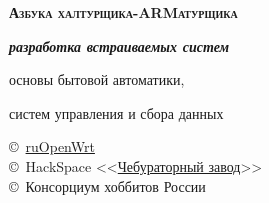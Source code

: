 \begin{titlepage}
\vspace{1.5cm}

\begin{centering}

{\Huge \textbf{\textsc{Азбука халтурщика-ARMатурщика \bigskip}}}

{\Huge \textbf{\textit{разработка встраиваемых систем}}}

{\Large 
основы бытовой автоматики,

систем управления и сбора данных
}

\end{centering}

\vspace{1cm}

{\large
\noindent
\copyright\
\href{https://groups.google.com/forum/\#!forum/openwrt2ru}{ruOpenWrt}
 \\
\copyright\
HackSpace
<<\href{https://github.com/ponyatov/CHBZ/raw/master/presentation.pdf}{Чебураторный
завод}>> \\
\copyright\
Консорциум хоббитов России
}
\end{titlepage}
